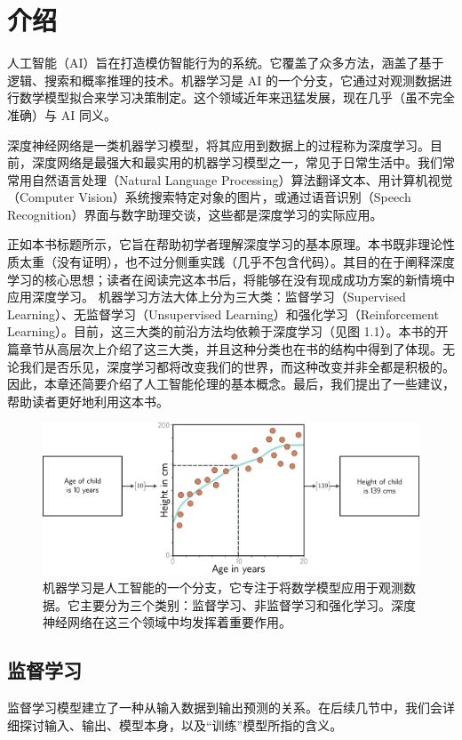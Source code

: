 \chapter{介绍}

人工智能（AI）旨在打造模仿智能行为的系统。它覆盖了众多方法，涵盖了基于逻辑、搜索和概率推理的技术。机器学习是 AI 的一个分支，它通过对观测数据进行数学模型拟合来学习决策制定。这个领域近年来迅猛发展，现在几乎（虽不完全准确）与 AI 同义。

深度神经网络是一类机器学习模型，将其应用到数据上的过程称为深度学习。目前，深度网络是最强大和最实用的机器学习模型之一，常见于日常生活中。我们常常用自然语言处理（Natural Language Processing）算法翻译文本、用计算机视觉（Computer Vision）系统搜索特定对象的图片，或通过语音识别（Speech Recognition）界面与数字助理交谈，这些都是深度学习的实际应用。

正如本书标题所示，它旨在帮助初学者理解深度学习的基本原理。本书既非理论性质太重（没有证明），也不过分侧重实践（几乎不包含代码）。其目的在于阐释深度学习的核心思想；读者在阅读完这本书后，将能够在没有现成成功方案的新情境中应用深度学习。
机器学习方法大体上分为三大类：监督学习（Supervised Learning）、无监督学习（Unsupervised Learning）和强化学习（Reinforcement Learning）。目前，这三大类的前沿方法均依赖于深度学习（见图 1.1）。本书的开篇章节从高层次上介绍了这三大类，并且这种分类也在书的结构中得到了体现。无论我们是否乐见，深度学习都将改变我们的世界，而这种改变并非全都是积极的。因此，本章还简要介绍了人工智能伦理的基本概念。最后，我们提出了一些建议，帮助读者更好地利用这本书。

\begin{figure}[ht!]
	\centering
	\includegraphics[width=\linewidth]{png/chapter1/IntroAgeHeight}
	\caption{机器学习是人工智能的一个分支，它专注于将数学模型应用于观测数据。它主要分为三个类别：监督学习、非监督学习和强化学习。深度神经网络在这三个领域中均发挥着重要作用。}
\end{figure}


\section{监督学习}
监督学习模型建立了一种从输入数据到输出预测的关系。在后续几节中，我们会详细探讨输入、输出、模型本身，以及“训练”模型所指的含义。

